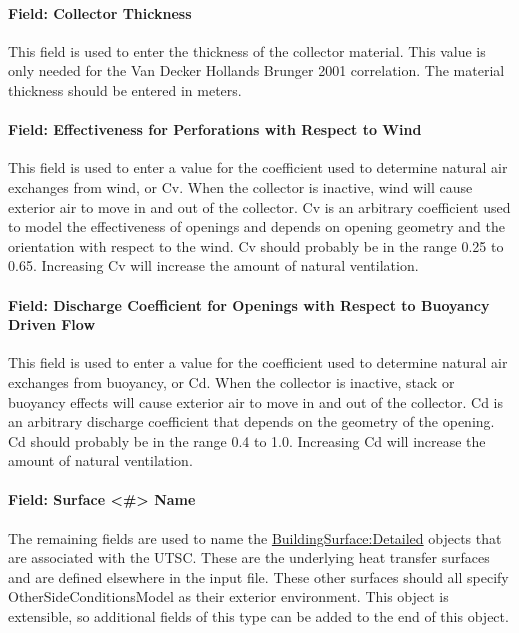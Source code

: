 \paragraph{Field: Collector Thickness}\label{field-collector-thickness}

This field is used to enter the thickness of the collector material. This value is only needed for the Van Decker Hollands Brunger 2001 correlation. The material thickness should be entered in meters.

\paragraph{Field: Effectiveness for Perforations with Respect to Wind}\label{field-effectiveness-for-perforations-with-respect-to-wind-000}

This field is used to enter a value for the coefficient used to determine natural air exchanges from wind, or Cv. When the collector is inactive, wind will cause exterior air to move in and out of the collector. Cv is an arbitrary coefficient used to model the effectiveness of openings and depends on opening geometry and the orientation with respect to the wind. Cv should probably be in the range 0.25 to 0.65. Increasing Cv will increase the amount of natural ventilation.

\paragraph{Field: Discharge Coefficient for Openings with Respect to Buoyancy Driven Flow}\label{field-discharge-coefficient-for-openings-with-respect-to-buoyancy-driven-flow-000}

This field is used to enter a value for the coefficient used to determine natural air exchanges from buoyancy, or Cd. When the collector is inactive, stack or buoyancy effects will cause exterior air to move in and out of the collector. Cd is an arbitrary discharge coefficient that depends on the geometry of the opening. Cd should probably be in the range 0.4 to 1.0. Increasing Cd will increase the amount of natural ventilation.

\paragraph{Field: Surface \textless{}\#\textgreater{} Name}\label{field-surface-name-3-001}

The remaining fields are used to name the \hyperref[buildingsurfacedetailed]{BuildingSurface:Detailed} objects that are associated with the UTSC. These are the underlying heat transfer surfaces and are defined elsewhere in the input file. These other surfaces should all specify OtherSideConditionsModel as their exterior environment. This object is extensible, so additional fields of this type can be added to the end of this object.

